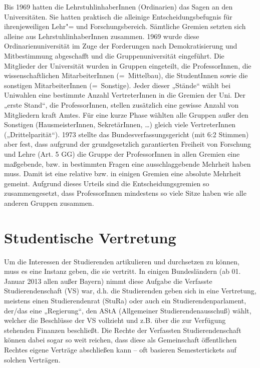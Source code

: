 Bis 1969 hatten die LehrstuhlinhaberInnen (Ordinarien) das Sagen an den
Universitäten. Sie hatten praktisch die alleinige Entscheidungsbefugnis
für ihrenjeweiligen Lehr"= und Forschungsbereich. Sämtliche Gremien setzten
sich alleine aus LehrstuhlinhaberInnen zusammen. 1969 wurde diese
Ordinarienuniversität im Zuge der Forderungen nach Demokratisierung und
Mitbestimmung abgeschafft und die Gruppenuniversität eingeführt. Die
Mitglieder der Universität wurden in Gruppen eingeteilt, die
ProfessorInnen, die wissenschaftlichen MitarbeiterInnen (=\ Mittelbau), die
StudentInnen sowie die sonstigen MitarbeiterInnen (=\ Sonstige). Jeder
dieser „Stände“ wählt bei Uniwahlen eine bestimmte Anzahl VertreterInnen
in die Gremien der Uni. Der „erste Stand“, die ProfessorInnen, stellen
zusätzlich eine gewisse Anzahl von Mitgliedern kraft Amtes. Für eine kurze
Phase wählten alle Gruppen außer den Sonstigen (HausmeisterInnen,
SekretärInnen, \dots) gleich viele VertreterInnen („Drittelparität“).
1973 stellte das Bundesverfassungsgericht (mit 6:2 Stimmen) aber fest, dass
aufgrund der grundgesetzlich garantierten Freiheit von Forschung und Lehre
(Art. 5 GG) die Gruppe der ProfessorInnen in allen Gremien eine
maßgebende, bzw. in bestimmten Fragen eine ausschlaggebende Mehrheit haben
muss. Damit ist eine relative bzw. in einigen Gremien eine absolute
Mehrheit gemeint. Aufgrund dieses Urteils sind die Entscheidungsgremien so
zusammengesetzt, dass ProfessorInnen mindestens so viele Sitze haben wie
alle anderen Gruppen zusammen.



\section{Studentische Vertretung}
Um die Interessen der Studierenden artikulieren und durchsetzen zu können,
muss es eine Instanz geben, die sie vertritt. In einigen Bundesländern
(ab 01. Januar 2013 allen außer Bayern) nimmt diese Aufgabe die
Verfasste Studierendenschaft (VS) war, d.h. die Studierenden geben sich
in eine Vertretung, meistens einen Studierendenrat (StuRa)
oder auch ein Studierendenparlament, der/das eine „Regierung“, den AStA
(Allgemeiner Studierendenausschuß) wählt, welcher die Beschlüsse der VS
vollzieht und z.B. über die zur Verfügung stehenden Finanzen beschließt.
Die Rechte der Verfassten Studierendenschaft können dabei sogar so weit
reichen, dass diese als Gemeinschaft öffentlichen Rechtes eigene Verträge
abschließen kann -- oft basieren Semestertickets auf solchen Verträgen.

